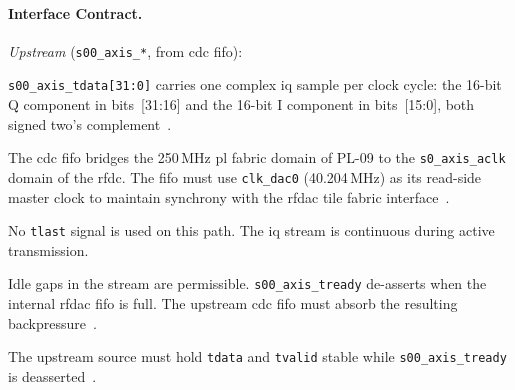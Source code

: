 \FloatBarrier



\FloatBarrier
\paragraph{Interface Contract.}

\textit{Upstream} (\texttt{s00\_axis\_*}, from \ac{cdc} \ac{fifo}):
\begin{tightemize}
  \item \texttt{s00\_axis\_tdata[31:0]} carries one complex
        \ac{iq} sample per clock cycle: the 16-bit Q component
        in bits~[31:16] and the 16-bit I component in bits~[15:0],
        both signed two's complement~\cite{AMD_PG269}.
  \item The \ac{cdc} \ac{fifo} bridges the 250\,MHz
        \ac{pl} fabric domain of PL-09 to the
        \texttt{s0\_axis\_aclk} domain of the \ac{rfdc}.
        The \ac{fifo} must use \texttt{clk\_dac0} (40.204\,MHz)
        as its read-side master clock to maintain synchrony with
        the \ac{rfdac} tile fabric interface~\cite{AMD_PG269}.
  \item No \texttt{tlast} signal is used on this path.
        The \ac{iq} stream is continuous during active transmission.
  \item Idle gaps in the stream are permissible.
        \texttt{s00\_axis\_tready} de-asserts when the internal
        \ac{rfdac} \ac{fifo} is full.
        The upstream \ac{cdc} \ac{fifo} must absorb the resulting
        backpressure~\cite{AMD_PG269}.
  \item The upstream source must hold \texttt{tdata} and
        \texttt{tvalid} stable while
        \texttt{s00\_axis\_tready} is
        deasserted~\cite{ARM_IHI0022}.
\end{tightemize}

